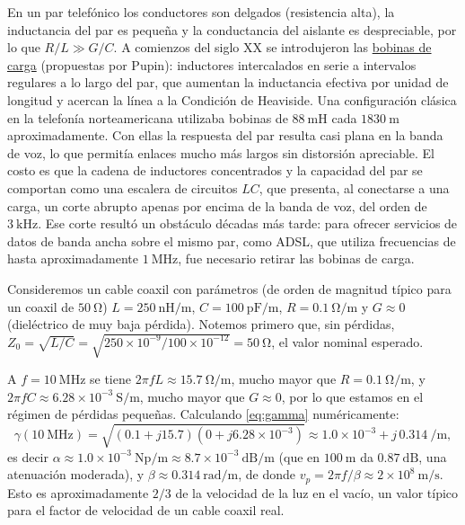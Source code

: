 \begin{ejemplo}\label{ejemplo:bobinas de carga}
En un par telefónico los conductores son delgados (resistencia alta), la inductancia del par es pequeña y la conductancia del aislante es despreciable, por lo que $R/L\gg G/C$. A comienzos del siglo XX se introdujeron las \href{https://en.wikipedia.org/wiki/Loading_coil}{bobinas de carga} (propuestas por Pupin): inductores intercalados en serie a intervalos regulares a lo largo del par, que aumentan la inductancia efectiva por unidad de longitud y acercan la línea a la Condición de Heaviside. Una configuración clásica en la telefonía norteamericana utilizaba bobinas de $88\ \unit{\milli\henry}$ cada $1830\ \unit{\meter}$ aproximadamente.
Con ellas la respuesta del par resulta casi plana en la banda de voz, lo que permitía enlaces mucho más largos sin distorsión apreciable. El costo es que la cadena de inductores concentrados y la capacidad del par se comportan como una escalera de circuitos $LC$, que presenta, al conectarse a una carga, un corte abrupto apenas por encima de la banda de voz, del orden de $3\ \unit{\kilo\hertz}$. Ese corte resultó un obstáculo décadas más tarde: para ofrecer servicios de datos de banda ancha sobre el mismo par, como ADSL, que utiliza frecuencias de hasta aproximadamente $1\ \unit{\mega\hertz}$, fue necesario retirar las bobinas de carga.
\end{ejemplo}

\begin{ejemplo}\label{ejemplo:coaxil parametros}
Consideremos un cable coaxil con parámetros (de orden de magnitud típico para un coaxil de $50\ \unit{\ohm}$) $L=250\ \unit{\nano\henry\per\meter}$, $C=100\ \unit{\pico\farad\per\meter}$, $R=0.1\ \unit{\ohm\per\meter}$ y $G\approx 0$ (dieléctrico de muy baja pérdida). Notemos primero que, sin pérdidas, $Z_0=\sqrt{L/C}=\sqrt{250\times 10^{-9}/100\times 10^{-12}}=50\ \unit{\ohm}$, el valor nominal esperado.

A $f=10\ \unit{\mega\hertz}$ se tiene $2\pi f L \approx 15.7\ \unit{\ohm\per\meter}$, mucho mayor que $R=0.1\ \unit{\ohm\per\meter}$, y $2\pi f C \approx 6.28\times 10^{-3}\ \unit{\siemens\per\meter}$, mucho mayor que $G\approx 0$, por lo que estamos en el régimen de pérdidas pequeñas. Calculando \eqref{eq:gamma} numéricamente:
\begin{equation*}
    \gamma(10\ \unit{\mega\hertz}) = \sqrt{(0.1+j15.7)(0+j6.28\times 10^{-3})} \approx 1.0\times 10^{-3} + j\, 0.314\ \unit{\per\meter},
\end{equation*}
es decir $\alpha \approx 1.0\times 10^{-3}\ \unit{\neper\per\meter} \approx 8.7\times 10^{-3}\ \unit{\deci\bel\per\meter}$ (que en $100\ \unit{\meter}$ da $0.87\ \unit{\deci\bel}$, una atenuación moderada), y $\beta\approx 0.314\ \unit{\radian\per\meter}$, de donde $v_p = 2\pi f/\beta \approx 2\times 10^8\ \unit{\meter\per\second}$. Esto es aproximadamente $2/3$ de la velocidad de la luz en el vacío, un valor típico para el factor de velocidad de un cable coaxil real.
\end{ejemplo}

